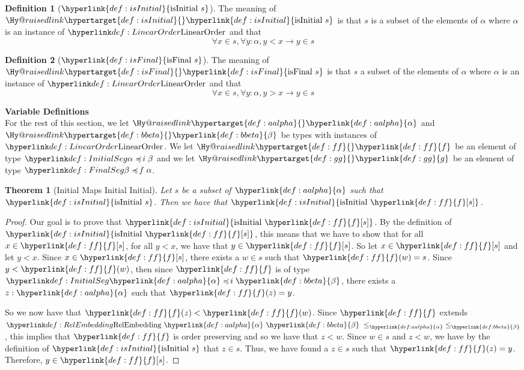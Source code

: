 \documentclass{article}
\makeatletter
\newcommand\newlink[2]{{\protect\hyperlink{#1}{\normalcolor #2}}}
\newcommand\newtarget[2]{\Hy@raisedlink{\hypertarget{#1}{}}#2}
\newtheorem{theorem}{Theorem}
\theoremstyle{definition}
\newtheorem{definition}{Definition}
\makeatother
\begin{document}
\newcommand\isInitial[1]{\newlink{def:isInitial}{\text{isInitial } #1}}
\begin{definition}[$\isInitial{s}$]
The meaning of $\newtarget{def:isInitial}{\isInitial{s}}$ is that $s$ is a subset of the elements of $\alpha$ where $\alpha$ is an instance of $\LinearOrder$ and that
\[
\forall x \in s, \forall y : \alpha, y < x \to y \in s
\]
\end{definition}

\newcommand\isFinal[1]{\newlink{def:isFinal}{\text{isFinal } #1}}
\begin{definition}[$\isFinal{s}$]
The meaning of $\newtarget{def:isFinal}{\isFinal{s}}$ is that $s$ a subset of the elements of $\alpha$ where $\alpha$ is an instance of $\LinearOrder$ and that
\[
\forall x \in s, \forall y : \alpha, y > x \to y \in s
\]
\end{definition}

\newcommand\aalpha{\newlink{def:aalpha}{\alpha}}
\newcommand\bbeta{\newlink{def:bbeta}{\beta}}
\newcommand\tf{\newlink{def:ff}{f}}
\newcommand\tg{\newlink{def:gg}{g}}
\textbf{Variable Definitions}\\
For the rest of this section, we let $\newtarget{def:aalpha}{\aalpha}$ and $\newtarget{def:bbeta}{\bbeta}$ be types with instances of $\LinearOrder$.
We let $\newtarget{def:ff}{\tf}$ be an element of type $\InitialSeg{\alpha}{\beta}$ and we let $\newtarget{def:gg}{\tg}$ be an element of type $\FinalSeg{\beta}{\alpha}$.

\begin{theorem}[Initial Maps Initial Initial]
\label{initial_maps_initial_initial}
Let $s$ be a subset of $\aalpha$ such that $\isInitial{s}$. Then we have that $\isInitial{\tf[s]}$.
\end{theorem}
\begin{proof}
Our goal is to prove that $\isInitial{\tf[s]}$. By the definition of $\isInitial{\tf[s]}$, this means that we have to show that for all $x\in \tf[s]$, for all $y < x$, we have that $y\in \tf[s]$. So let $x\in \tf[s]$ and let $y < x$. Since $x\in \tf[s]$, there exists a $w\in s$ such that $\tf(w) = s$. Since $y < \tf(w)$, then since $\tf$ is of type $\InitialSeg{\aalpha}{\bbeta}$, there exists a $z : \aalpha$ such that $\tf(z) = y$.

So we now have that $\tf(z) < \tf(w)$. Since $\tf$ extends $\RelEmbedding{\aalpha}{\bbeta}{\le_\aalpha}{\le_\bbeta}$, this implies that $\tf$ is order preserving and so we have that $z < w$. Since $w\in s$ and $z < w$, we have by the definition of $\isInitial{s}$ that $z \in s$. Thus, we have found a $z\in s$ such that $\tf(z) = y$. Therefore, $y\in \tf[s]$.
\end{proof}
\end{document}
